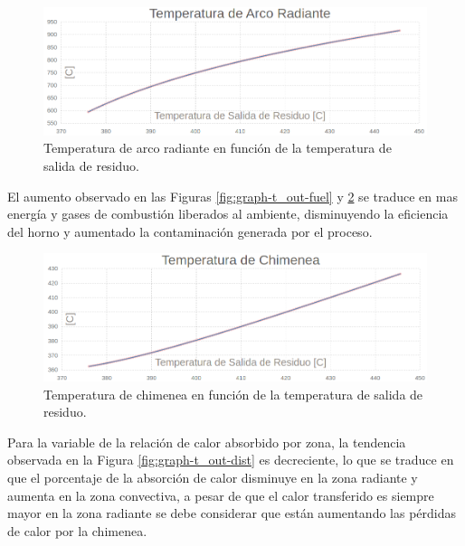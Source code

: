 \begin{figure}[H]\begin{center}
\includegraphics[scale=0.46]{images/graph-t_out-arc}
\caption[Temperatura de arco radiante en función de Temperatura de salida de residuo]{Temperatura de arco radiante en función de la temperatura de salida de residuo.}
\label{fig:graph-t_out-arc}\end{center}\end{figure}
\par El aumento observado en las Figuras \ref{fig:graph-t_out-fuel} y \ref{fig:graph-t_out-chim} se traduce en mas energía y gases de combustión liberados al ambiente, disminuyendo la eficiencia del horno y aumentado la contaminación generada por el proceso.
\begin{figure}[H]\begin{center}
\includegraphics[scale=0.46]{images/graph-t_out-chim}
\caption[Temperatura de chimenea en función de Temperatura de salida de residuo]{Temperatura de chimenea en función de la temperatura de salida de residuo.}
\label{fig:graph-t_out-chim}\end{center}\end{figure}
\par Para la variable de la relación de calor absorbido por zona, la tendencia observada en la Figura \ref{fig:graph-t_out-dist} es decreciente, lo que se traduce en que el porcentaje de la absorción de calor disminuye en la zona radiante y aumenta en la zona convectiva, a pesar de que el calor transferido es siempre mayor en la zona radiante se debe considerar que están aumentando las pérdidas de calor por la chimenea.
